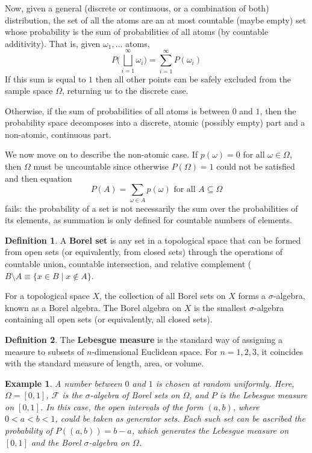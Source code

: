 \documentclass{article}
\newtheorem{example}{Example}[section]
\theoremstyle{remark}
\theoremstyle{definition}
\newtheorem{definition}{Definition}[section]
\begin{document}
Now, given a general (discrete or continuous, or a combination of both) distribution, the set of all the atoms are an at most countable (maybe empty) set whose probability is the sum of probabilities of all atoms (by countable additivity). That is, given $\omega_1, \ldots$ atoms, 
\[P \bigg( \bigsqcup_{i=1}^\infty \omega_i\bigg) = \sum_{i=1}^\infty P(\omega_i)\]
If this sum is equal to $1$ then all other points can be safely excluded from the sample space $\Omega$, returning us to the discrete case. 

Otherwise, if the sum of probabilities of all atoms is between $0$ and $1$, then the probability space decomposes into a discrete, atomic (possibly empty) part and a non-atomic, continuous part. 

We now move on to describe the non-atomic case. If $p(\omega) = 0$ for all $\omega \in \Omega$, then $\Omega$ must be uncountable since otherwise $P(\Omega) = 1$ could not be satisfied and then equation 
\[P(A) = \sum_{\omega \in A} p(\omega) \text{ for all } A \subseteq \Omega\]
fails: the probability of a set is not necessarily the sum over the probabilities of its elements, as summation is only defined for countable numbers of elements. 


\begin{definition}
A \textbf{Borel set} is any set in a topological space that can be formed from open sets (or equivalently, from closed sets) through the operations of countable union, countable intersection, and relative complement ($B \setminus A \equiv \{x \in B\;|\; x \not\in A\}$. 

For a topological space $X$, the collection of all Borel sets on $X$ forms a $\sigma$-algebra, known as a Borel algebra. The Borel algebra on $X$ is the smallest $\sigma$-algebra containing all open sets (or equivalently, all closed sets). 
\end{definition}

\begin{definition}
The \textbf{Lebesgue measure} is the standard way of assigning a measure to subsets of $n$-dimensional Euclidean space. For $n = 1, 2, 3$, it coincides with the standard measure of length, area, or volume. 
\end{definition}

\begin{example}
A number between $0$ and $1$ is chosen at random uniformly. Here, $\Omega = [0,1]$, $\mathcal{F}$ is the $\sigma$-algebra of Borel sets on $\Omega$, and $P$ is the Lebesgue measure on $[0,1]$. In this case, the open intervals of the form $(a, b)$, where $0<a<b<1$, could be taken as generator sets. Each such set can be ascribed the probability of $P((a, b)) = b-a$, which generates the Lebesgue measure on $[0,1]$ and the Borel $\sigma$-algebra on $\Omega$. 
\end{example}
\end{document}
